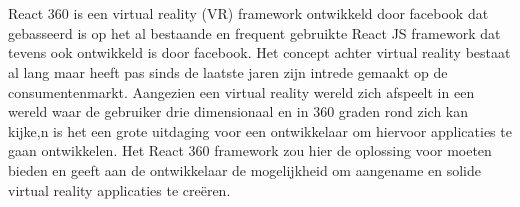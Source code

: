 
%
%

%



\chapter*{}

React 360 is een virtual reality (VR) framework ontwikkeld door facebook dat gebasseerd is op het al bestaande en frequent gebruikte React JS framework dat tevens ook ontwikkeld is door facebook. Het concept achter virtual reality bestaat al lang maar heeft pas sinds de laatste jaren zijn intrede gemaakt op de consumentenmarkt. Aangezien een virtual reality wereld zich afspeelt in een wereld waar de gebruiker drie dimensionaal en in 360 graden rond zich kan kijke,n is het een grote uitdaging voor een ontwikkelaar om hiervoor applicaties te gaan ontwikkelen. Het React 360 framework zou hier de oplossing voor moeten bieden en geeft aan de ontwikkelaar de mogelijkheid om aangename en solide virtual reality applicaties te creëren.

